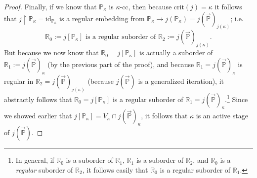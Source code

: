 \documentclass{amsart}
\begin{document}
\begin{proof}
Finally, if we know that $\mathbb{P}_\kappa$ is $\kappa$-cc, then because $\text{crit}(j) = \kappa$ it follows that $j \restriction \mathbb{P}_\kappa = \text{id}_{\mathbb{P}_\kappa}$ is a regular embedding from $\mathbb{P}_\kappa \to j(\mathbb{P}_\kappa) = j(\vec{\mathbb{P}})_{j(\kappa)}$; i.e.\
\[
\mathbb{R}_0 :=j[\mathbb{P}_\kappa] \text{ is a regular suborder of }  \mathbb{R}_2:= j(\vec{\mathbb{P}})_{j(\kappa)}   .
\]
But because we now know that $\mathbb{R}_0 = j[\mathbb{P}_\kappa]$ is actually a suborder of $\mathbb{R}_1:= j(\vec{\mathbb{P}})_\kappa$ (by the previous part of the proof), and because $\mathbb{R}_1 = j(\vec{\mathbb{P}})_\kappa$ is regular in $\mathbb{R}_2 = j(\vec{\mathbb{P}})_{j(\kappa)}$ (because $j(\vec{\mathbb{P}})$ is a generalized iteration), it abstractly follows that $\mathbb{R}_0 = j[\mathbb{P}_\kappa]$ is a regular suborder of $\mathbb{R}_1 = j(\vec{\mathbb{P}})_\kappa$.\footnote{In general, if $\mathbb{R}_0$ is a suborder of $\mathbb{R}_1$, $\mathbb{R}_1$ is a suborder of $\mathbb{R}_2$, and $\mathbb{R}_0$ is a \emph{regular} suborder of $\mathbb{R}_2$, it follows easily that $\mathbb{R}_0$ is a regular suborder of $\mathbb{R}_1$.}   Since we showed earlier that $j[\mathbb{P}_\kappa] = V_\kappa \cap j(\vec{\mathbb{P}})_\kappa$, it follows that $\kappa$ is an active stage of $j(\vec{\mathbb{P}})$.
\end{proof}
\end{document}
